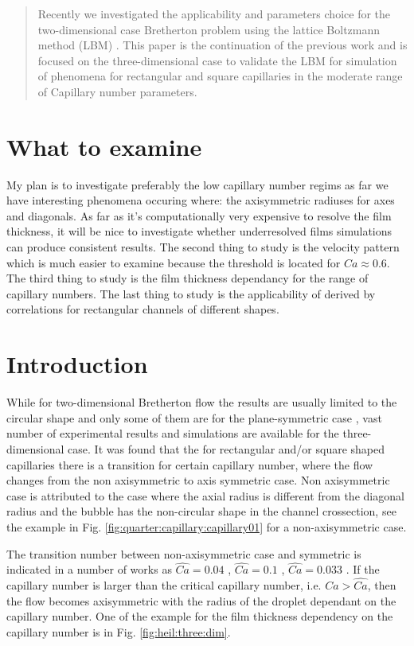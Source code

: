 \documentclass{article}
\begin{document}
\begin{abstract}
Recently we investigated the applicability and parameters choice for the two-dimensional case
Bretherton problem using the lattice Boltzmann method (LBM) \cite{kuzmin-binary2d}. This
paper is the continuation of the previous work and is focused on the three-dimensional case to
validate the LBM for simulation of phenomena for rectangular and square capillaries in the
moderate range of Capillary number parameters. 
\end{abstract}

\section{What to examine}
My plan is to investigate preferably the low capillary number regims as far we have interesting
phenomena occuring where: the axisymmetric radiuses for axes and diagonals. As far as it's
computationally very expensive to resolve the film thickness, it will be nice to investigate
whether underresolved films simulations can produce consistent results. The second thing to study
is the velocity pattern which is much easier to examine because the threshold is located for
$Ca\approx 0.6$. The third thing to study is the film thickness dependancy for the range of
capillary numbers. The last thing to study is the applicability of derived by \citet{heil-threedim}
correlations for rectangular channels of different shapes.

\section{Introduction}
While for two-dimensional Bretherton flow the results are usually limited to the circular shape and
only some of them are for the plane-symmetric case \cite{giavedoni-numerical,heil-bretherton},
vast number of experimental results and simulations are available for the three-dimensional case.
It was found that the for rectangular and/or square shaped capillaries there is a transition for
certain capillary number, where the flow changes from the non axisymmetric to axis symmetric case.
Non axisymmetric case is attributed to the case where the axial radius is different from the
diagonal radius and the bubble has the non-circular shape in the channel crossection, see the
example in Fig. \ref{fig:quarter:capillary:capillary01} for a non-axisymmetric case.

The transition number between non-axisymmetric case and symmetric is indicated in a number of
works as $\widehat{Ca}=0.04$ \cite{cerro-bubble-train},
$\widehat{Ca}=0.1$
\cite{cerro-space}, $\widehat{Ca}=0.033$ \cite{heil-threedim}. If the capillary number is larger
than
the critical capillary number, i.e. $Ca>\widehat{Ca}$, then the flow becomes axisymmetric with the
radius of the droplet dependant on the capillary number. One of the example for the film
thickness dependency on the capillary number is in Fig. \ref{fig:heil:three:dim}.
\end{document}
